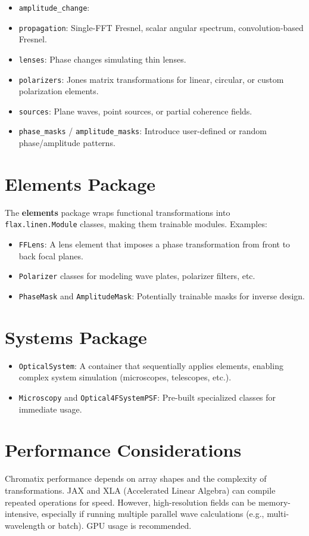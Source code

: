 \documentclass[a4paper,12pt]{report}
\begin{document}
\begin{itemize}
    \item \texttt{amplitude_change}:
    \item \texttt{propagation}: Single-FFT Fresnel, scalar angular spectrum, convolution-based Fresnel.
    \item \texttt{lenses}: Phase changes simulating thin lenses.
    \item \texttt{polarizers}: Jones matrix transformations for linear, circular, or custom polarization elements.
    \item \texttt{sources}: Plane waves, point sources, or partial coherence fields.
    \item \texttt{phase\_masks} / \texttt{amplitude\_masks}: Introduce user-defined or random phase/amplitude patterns.
\end{itemize}

\section{Elements Package}
The \textbf{elements} package wraps functional transformations into \texttt{flax.linen.Module} classes, making them trainable modules. Examples:
\begin{itemize}
    \item \texttt{FFLens}: A lens element that imposes a phase transformation from front to back focal planes.
    \item \texttt{Polarizer} classes for modeling wave plates, polarizer filters, etc.
    \item \texttt{PhaseMask} and \texttt{AmplitudeMask}: Potentially trainable masks for inverse design.
\end{itemize}

\section{Systems Package}
\begin{itemize}
    \item \texttt{OpticalSystem}: A container that sequentially applies elements, enabling complex system simulation (microscopes, telescopes, etc.).
    \item \texttt{Microscopy} and \texttt{Optical4FSystemPSF}: Pre-built specialized classes for immediate usage.
\end{itemize}

\section{Performance Considerations}
Chromatix performance depends on array shapes and the complexity of transformations. JAX and XLA (Accelerated Linear Algebra) can compile repeated operations for speed. However, high-resolution fields can be memory-intensive, especially if running multiple parallel wave calculations (e.g., multi-wavelength or batch). GPU usage is recommended.
\end{document}
